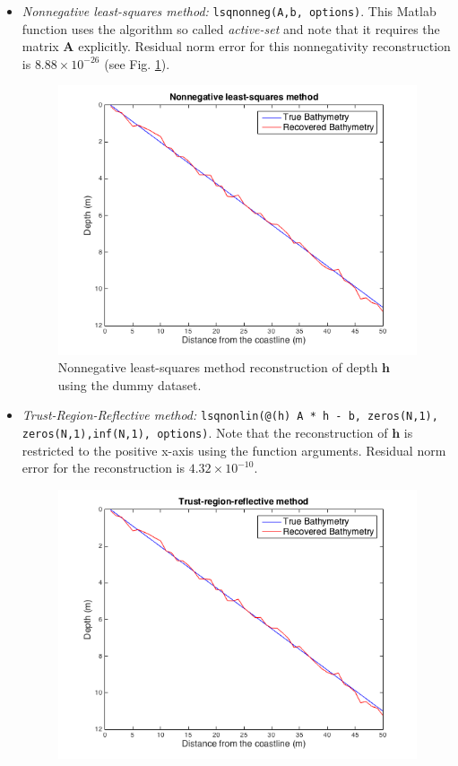 \begin{itemize}
\item[(1)]  \textit{Nonnegative least-squares method:}  \verb|lsqnonneg(A,b, options)|. This Matlab function uses the algorithm so called \textit{active-set} and note that it requires the matrix $\mathbf{A}$ explicitly. Residual norm error for this nonnegativity reconstruction is $8.88 \times 10^{-26}$ (see Fig. \ref{nonLS_fig}).   \\

\begin{figure}[H]
\center
\includegraphics[scale=0.6]{img/NonLS_linear.png} 
\caption{Nonnegative least-squares method reconstruction of depth $\mathbf{h}$ using the dummy dataset.}
\label{nonLS_fig}
\end{figure}
\item[(2)]  \textit{Trust-Region-Reflective method:}  \verb|lsqnonlin(@(h) A * h - b, zeros(N,1), zeros(N,1),inf(N,1), options)|. Note that the reconstruction of $\mathbf{h}$ is restricted to the positive x-axis using the function arguments. Residual norm error for the reconstruction is $4.32 \times 10^{-10}$. 
\begin{figure}[H]
\center
\includegraphics[scale=0.6]{img/trust_region_linear.png} 

\end{figure}
\end{itemize}
